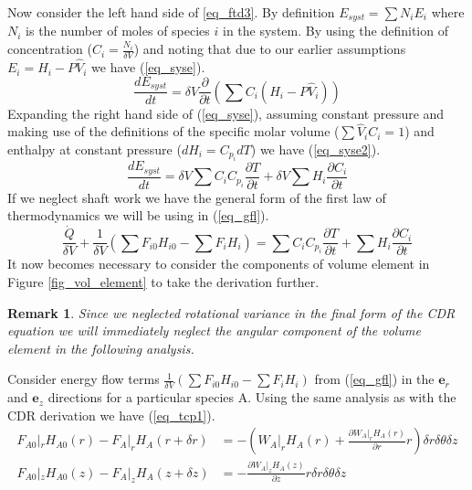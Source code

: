 \documentclass[11pt,fleqn]{article}
\theoremstyle{defstyle}
\newtheorem{rmrk}{Remark}[section]
\begin{document}
Now consider the left hand side of \ref{eq_ftd3}. By definition $E_{syst} = \sum N_iE_i$ where $N_i$ is the number of moles of species $i$ in the system. By using the definition of concentration ($C_i = \frac{N_i}{\delta V}$) and noting that due to our earlier assumptions $E_i = H_i - P\hat{V}_i$  we have (\ref{eq_syse}).
\begin{equation}
\frac{d E_{syst}}{dt} = \delta V \frac{\partial}{\partial t}(\sum C_i (H_i - P\hat{V}_i))
\label{eq_syse}
\end{equation}
Expanding the right hand side of (\ref{eq_syse}), assuming constant pressure and making use of the definitions of the specific molar volume ($\sum \hat{V}_iC_i = 1$) and enthalpy at constant pressure ($dH_i = C_{p_i}dT$) we have (\ref{eq_syse2}).
\begin{equation}
\frac{d E_{syst}}{dt} = \delta V \sum C_i C_{p_i} \frac{\partial T}{\partial t} + \delta V \sum H_i \frac{\partial C_i}{\partial t} 
\label{eq_syse2}
\end{equation}
If we neglect shaft work we have the general form of the first law of thermodynamics we will be using in (\ref{eq_gfl}).  
\begin{equation}
\frac{\dot{Q}}{\delta V} + \frac{1}{\delta V}(\sum F_{i0}H_{i0} -\sum F_{i}H_{i}) =\sum C_i C_{p_i} \frac{\partial T}{\partial t} + \sum H_i \frac{\partial C_i}{\partial t}
\label{eq_gfl}
\end{equation}
It now becomes necessary to consider the components of volume element  in Figure \ref{fig_vol_element} to take the derivation further.
\begin{rmrk}
Since we neglected rotational variance in the final form of the CDR equation we will immediately neglect the angular component of the volume element in the following analysis.  
\end{rmrk}
Consider energy flow terms $\frac{1}{\delta V}(\sum F_{i0}H_{i0} -\sum F_{i}H_{i})$ from (\ref{eq_gfl}) in the $\mathbf{e}_r$ and $\mathbf{e}_z$ directions for a particular species A. Using the same analysis as with the CDR derivation we have (\ref{eq_tcp1}).
\begin{equation}
\begin{aligned}
F_{A0}|_r H_{A0}(r) - F_{A}|_rH_{A}(r+\delta r) &= -(W_A|_r H_A(r) + \frac{\partial W_A|_r H_A(r)}{\partial r}r)\delta r \delta \theta \delta z \\
F_{A0}|_z H_{A0}(z) - F_{A}|_z H_{A}(z+\delta z) &= -\frac{\partial W_A|_z H_A(z)}{\partial z}r \delta r \delta \theta \delta z   
\end{aligned}
\label{eq_tcp1}
\end{equation}
\end{document}
